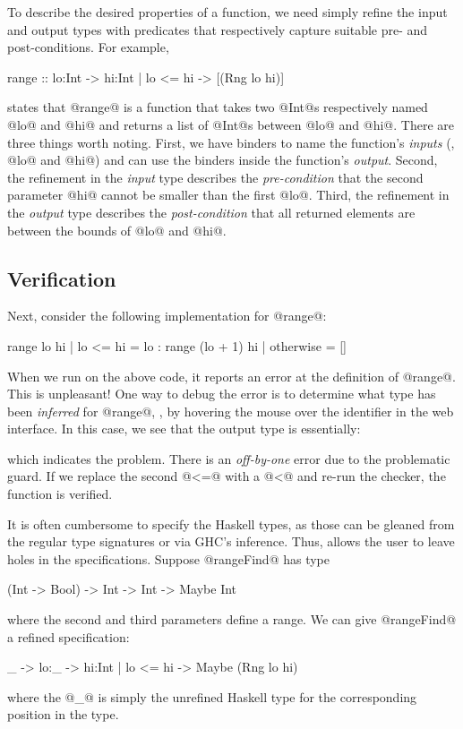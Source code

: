To describe the desired properties of a function, we need
simply refine the input and output types with predicates 
that respectively capture suitable pre- and post-conditions. 
For example,
%
\begin{code}
  range :: lo:Int -> hi:{Int | lo <= hi} 
        -> [(Rng lo hi)]
\end{code}
%
states that @range@ is a function that takes two @Int@s 
respectively named @lo@ and @hi@ and returns a list of @Int@s 
between @lo@ and @hi@. There are three things worth
noting.
%
First, we have binders to name the function's \emph{inputs} 
(\eg, @lo@ and @hi@) and can use the binders inside the 
function's \emph{output}.
%
Second, the refinement in the \emph{input} type describes the 
\emph{pre-condition} that the second parameter @hi@ cannot 
be smaller than the first @lo@.
%
Third, the refinement in the \emph{output} type describes the
\emph{post-condition} that all returned elements are between 
the bounds of @lo@ and @hi@.


\subsection{Verification}\label{sec:tool:verification}

Next, consider the following implementation for @range@:
%
\begin{code}
  range lo hi 
    | lo <= hi  = lo : range (lo + 1) hi
    | otherwise = []
\end{code}
%
When we run \toolname on the above code, it reports an 
error at the definition of @range@. This is unpleasant! 
One way to debug the error is to determine what type has
been \emph{inferred} for @range@, \eg, by hovering the 
mouse over the identifier in the web interface. 
In this case, we see that the output type is essentially:
%
\begin{code}
  [{v:Int | lo <= v && v <= hi}]
\end{code}
%
which indicates the problem. There is an \emph{off-by-one} 
error due to the problematic guard. If we replace the second @<=@ 
with a @<@ and re-run the checker, the function is verified.

 It is often cumbersome to specify the Haskell
types, as those can be gleaned from the regular type signatures 
or via GHC's inference. Thus, \toolname allows the user to leave 
holes in the specifications. Suppose @rangeFind@ has type 
%
\begin{code}
  (Int -> Bool) -> Int -> Int -> Maybe Int
\end{code}
%
where the second and third parameters define a range. 
We can give @rangeFind@ a refined specification:
%
\begin{code}
  _ -> lo:_ -> hi:{Int | lo <= hi} 
    -> Maybe (Rng lo hi)
\end{code}
%
where the @_@ is simply the unrefined Haskell type for the 
corresponding position in the type.


